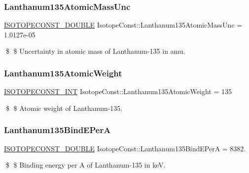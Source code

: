 \subsubsection{\texorpdfstring{Lanthanum135\+Atomic\+Mass\+Unc}{Lanthanum135AtomicMassUnc}}
{\footnotesize\ttfamily \mbox{\hyperlink{group___isotope_const-_macros_ga8f45a7272ce02c0b4c65c44636ed719a}{I\+S\+O\+T\+O\+P\+E\+C\+O\+N\+S\+T\+\_\+\+D\+O\+U\+B\+LE}} Isotope\+Const\+::\+Lanthanum135\+Atomic\+Mass\+Unc = 1.\+0127e-\/05}

\$ \$ Uncertainty in atomic mass of Lanthanum-\/135 in amu. \mbox{\label{group___isotope_const-_lanthanum-_la135_ga3317252d60321d65a2b050af4e556fa2}} 
\subsubsection{\texorpdfstring{Lanthanum135\+Atomic\+Weight}{Lanthanum135AtomicWeight}}
{\footnotesize\ttfamily \mbox{\hyperlink{group___isotope_const-_macros_ga5f18360b3e99483a35c32d789e62621c}{I\+S\+O\+T\+O\+P\+E\+C\+O\+N\+S\+T\+\_\+\+I\+NT}} Isotope\+Const\+::\+Lanthanum135\+Atomic\+Weight = 135}

\$ \$ Atomic weight of Lanthanum-\/135. \mbox{\label{group___isotope_const-_lanthanum-_la135_ga54f95eb129f4b883d8f274ed7cff060d}} 
\subsubsection{\texorpdfstring{Lanthanum135\+Bind\+E\+PerA}{Lanthanum135BindEPerA}}
{\footnotesize\ttfamily \mbox{\hyperlink{group___isotope_const-_macros_ga8f45a7272ce02c0b4c65c44636ed719a}{I\+S\+O\+T\+O\+P\+E\+C\+O\+N\+S\+T\+\_\+\+D\+O\+U\+B\+LE}} Isotope\+Const\+::\+Lanthanum135\+Bind\+E\+PerA = 8382.}

\$ \$ Binding energy per A of Lanthanum-\/135 in keV. \mbox{\label{group___isotope_const-_lanthanum-_la135_ga762828c68b37076891bc9b852ed06526}} 
